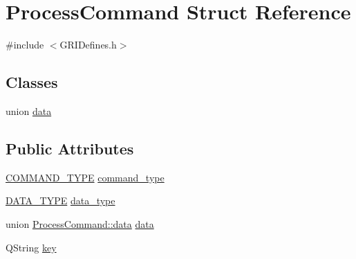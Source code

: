 \hypertarget{structProcessCommand}{\section{\-Process\-Command \-Struct \-Reference}
\label{structProcessCommand}
}


{\ttfamily \#include $<$\-G\-R\-I\-Defines.\-h$>$}

\subsection*{\-Classes}
\begin{DoxyCompactItemize}
\item 
union \hyperlink{unionProcessCommand_1_1data}{data}
\end{DoxyCompactItemize}
\subsection*{\-Public \-Attributes}
\begin{DoxyCompactItemize}
\item 
\hyperlink{GRIDefines_8h_a13bd38766753a1ef2cf1e3888d15fe0c}{\-C\-O\-M\-M\-A\-N\-D\-\_\-\-T\-Y\-P\-E} \hyperlink{structProcessCommand_afd8289b0435d3562920eb84a543bc88b}{command\-\_\-type}
\item 
\hyperlink{GRIDefines_8h_aa082c000e4eff6ed512714ea0a33d27b}{\-D\-A\-T\-A\-\_\-\-T\-Y\-P\-E} \hyperlink{structProcessCommand_ab1d813eb015c2f47b403c295398a2c77}{data\-\_\-type}
\item 
union \hyperlink{unionProcessCommand_1_1data}{\-Process\-Command\-::data} \hyperlink{structProcessCommand_acc38e81f24ae355107ba38783ef6072a}{data}
\item 
\-Q\-String \hyperlink{structProcessCommand_a376dd352cdec30077d0d5e69957d4ea4}{key}
\end{DoxyCompactItemize}



